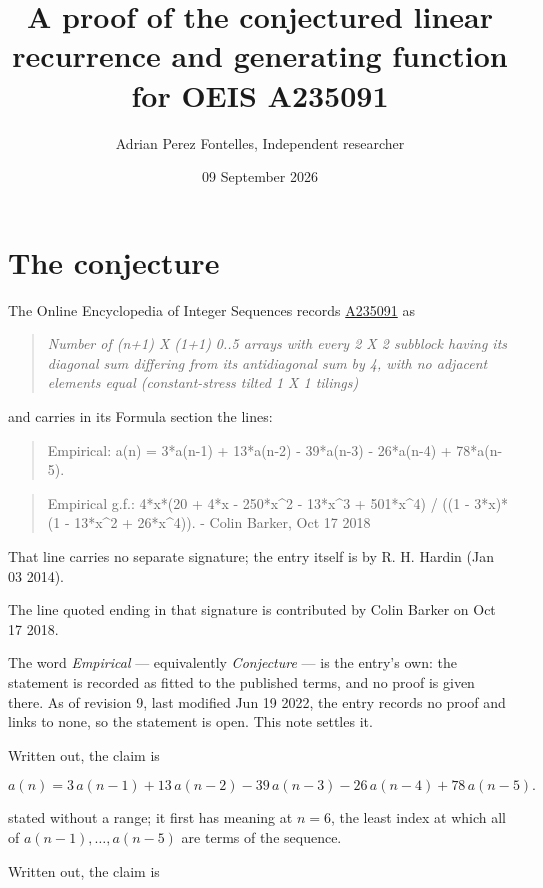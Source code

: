 \documentclass[11pt]{article}
\title{A proof of the conjectured linear recurrence and generating function for OEIS A235091}
\author{Adrian Perez Fontelles, Independent researcher}
\date{09 September 2026}
\theoremstyle{definition}
\begin{document}
\maketitle
\section{The conjecture}

The Online Encyclopedia of Integer Sequences records \href{https://oeis.org/A235091}{A235091} as

\begin{quote}\itshape Number of (n+1) X (1+1) 0..5 arrays with every 2 X 2 subblock having its diagonal sum differing from its antidiagonal sum by 4, with no adjacent elements equal (constant-stress tilted 1 X 1 tilings)\end{quote}

and carries in its Formula section the lines:

\begin{quote}\ttfamily Empirical: a(n) = 3*a(n-1) + 13*a(n-2) - 39*a(n-3) - 26*a(n-4) + 78*a(n-5).\end{quote}

\begin{quote}\ttfamily Empirical g.f.: 4*x*(20 + 4*x - 250*x\textasciicircum{}2 - 13*x\textasciicircum{}3 + 501*x\textasciicircum{}4) / ((1 - 3*x)*(1 - 13*x\textasciicircum{}2 + 26*x\textasciicircum{}4)). - Colin Barker, Oct 17 2018\end{quote}

That line carries no separate signature; the entry itself is by R. H. Hardin (Jan 03 2014).

The line quoted ending in that signature is contributed by Colin Barker on Oct 17 2018.

The word {\itshape Empirical} --- equivalently {\itshape Conjecture} --- is the entry's own: the statement is recorded as fitted to the published terms, and no proof is given there. As of revision 9, last modified Jun 19 2022, the entry records no proof and links to none, so the statement is open. This note settles it.

Written out, the claim is

\[a(n) = 3\,a(n-1) + 13\,a(n-2) - 39\,a(n-3) - 26\,a(n-4) + 78\,a(n-5).\]

stated without a range; it first has meaning at $n = 6$, the least index at which all of $a(n-1),\dots,a(n-5)$ are terms of the sequence.

Written out, the claim is
\end{document}

